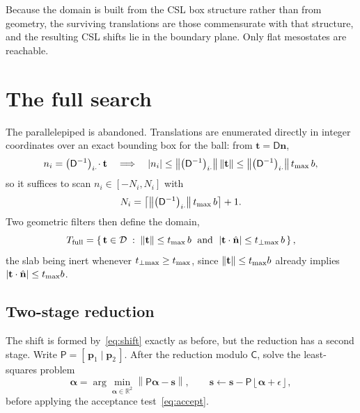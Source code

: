 Because the domain is built from the CSL box structure rather than from
geometry, the surviving translations are those commensurate with that structure,
and the resulting CSL shifts lie in the boundary plane. Only flat mesostates are
reachable.

\section*{The full search}

The parallelepiped is abandoned. Translations are enumerated directly in integer
coordinates over an exact bounding box for the ball: from
$\mathbf{t} = \mathsf{D}\mathbf{n}$,
\begin{equation}
  n_i = \left(\mathsf{D}^{-1}\right)_{i\cdot}\!\cdot \mathbf{t}
  \quad\Longrightarrow\quad
  \lvert n_i \rvert
  \le \left\lVert \left(\mathsf{D}^{-1}\right)_{i\cdot} \right\rVert
      \lVert \mathbf{t} \rVert
  \le \left\lVert \left(\mathsf{D}^{-1}\right)_{i\cdot} \right\rVert t_{\max}\, b ,
  \label{eq:bound}
\end{equation}
so it suffices to scan $n_i \in [-N_i, N_i]$ with
\begin{equation}
  N_i = \left\lceil
        \left\lVert \left(\mathsf{D}^{-1}\right)_{i\cdot} \right\rVert t_{\max}\, b
        \right\rceil + 1 .
  \label{eq:scanlimit}
\end{equation}
Two geometric filters then define the domain,
\begin{equation}
  T_{\text{full}}
  = \left\{\, \mathbf{t} \in \mathcal{D} \;:\;
      \lVert \mathbf{t} \rVert \le t_{\max}\, b
      \;\text{ and }\;
      \lvert \mathbf{t} \cdot \hat{\mathbf{n}} \rvert \le t_{\perp\max}\, b \,\right\},
  \label{eq:full-domain}
\end{equation}
the slab being inert whenever $t_{\perp\max} \ge t_{\max}$, since
$\lVert\mathbf{t}\rVert \le t_{\max} b$ already implies
$\lvert \mathbf{t}\cdot\hat{\mathbf{n}} \rvert \le t_{\max} b$.

\subsection*{Two-stage reduction}

The shift is formed by~\eqref{eq:shift} exactly as before, but the reduction has
a second stage. Write $\mathsf{P} = [\,\mathbf{p}_1 \mid \mathbf{p}_2\,]$. After
the reduction modulo $\mathsf{C}$, solve the least-squares problem
\begin{equation}
  \boldsymbol{\alpha}
  = \arg\min_{\boldsymbol{\alpha} \in \mathbb{R}^{2}}
    \left\lVert \mathsf{P}\boldsymbol{\alpha} - \mathbf{s} \right\rVert ,
  \qquad
  \mathbf{s} \leftarrow
  \mathbf{s} - \mathsf{P}
  \left\lfloor \boldsymbol{\alpha} + \epsilon \right\rfloor ,
  \label{eq:inplane-fold}
\end{equation}
before applying the acceptance test~\eqref{eq:accept}.

